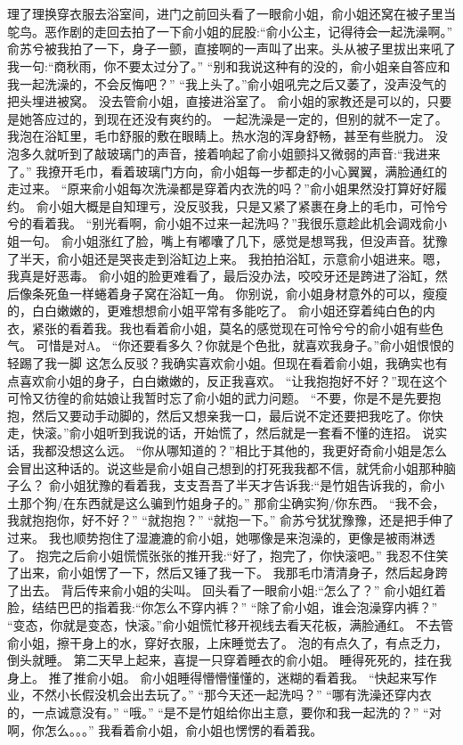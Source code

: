\chapter{}
理了理换穿衣服去浴室间，进门之前回头看了一眼俞小姐，俞小姐还窝在被子里当鸵鸟。恶作剧的走回去拍了一下俞小姐的屁股:“俞小公主，记得待会一起洗澡啊。”
俞苏兮被我拍了一下，身子一颤，直接啊的一声叫了出来。头从被子里拔出来吼了我一句:“商秋雨，你不要太过分了。”
“别和我说这种有的没的，俞小姐亲自答应和我一起洗澡的，不会反悔吧？”
“我上头了。”俞小姐吼完之后又萎了，没声没气的把头埋进被窝。
没去管俞小姐，直接进浴室了。
俞小姐的家教还是可以的，只要是她答应过的，到现在还没有爽约的。
一起洗澡是一定的，但别的就不一定了。
我泡在浴缸里，毛巾舒服的敷在眼睛上。热水泡的浑身舒畅，甚至有些脱力。
没泡多久就听到了敲玻璃门的声音，接着响起了俞小姐颤抖又微弱的声音:“我进来了。”
我撩开毛巾，看着玻璃门方向，俞小姐每一步都走的小心翼翼，满脸通红的走过来。
“原来俞小姐每次洗澡都是穿着内衣洗的吗？”俞小姐果然没打算好好履约。
俞小姐大概是自知理亏，没反驳我，只是又紧了紧裹在身上的毛巾，可怜兮兮的看着我。
“别光看啊，俞小姐不过来一起洗吗？”我很乐意趁此机会调戏俞小姐一句。
俞小姐涨红了脸，嘴上有嘟囔了几下，感觉是想骂我，但没声音。犹豫了半天，俞小姐还是哭丧走到浴缸边上来。
我拍拍浴缸，示意俞小姐进来。嗯，我真是好恶毒。
俞小姐的脸更难看了，最后没办法，咬咬牙还是跨进了浴缸，然后像条死鱼一样蜷着身子窝在浴缸一角。
你别说，俞小姐身材意外的可以，瘦瘦的，白白嫩嫩的，更难想想俞小姐平常有多能吃了。
俞小姐还穿着纯白色的内衣，紧张的看着我。我也看着俞小姐，莫名的感觉现在可怜兮兮的俞小姐有些色气。
可惜是对A。
“你还要看多久？你就是个色批，就喜欢我身子。”俞小姐恨恨的轻踢了我一脚
这怎么反驳？我确实喜欢俞小姐。但现在看着俞小姐，我确实也有点喜欢俞小姐的身子，白白嫩嫩的，反正我喜欢。
“让我抱抱好不好？”现在这个可怜又彷徨的俞姑娘让我暂时忘了俞小姐的武力问题。
“不要，你是不是先要抱抱，然后又要动手动脚的，然后又想亲我一口，最后说不定还要把我吃了。你快走，快滚。”俞小姐听到我说的话，开始慌了，然后就是一套看不懂的连招。
说实话，我都没想这么远。
“你从哪知道的？”相比于其他的，我更好奇俞小姐是怎么会冒出这种话的。说这些是俞小姐自己想到的打死我我都不信，就凭俞小姐那种脑子么？
俞小姐犹豫的看着我，支支吾吾了半天才告诉我:“是竹姐告诉我的，俞小土那个狗/在东西就是这么骗到竹姐身子的。”
那俞尘确实狗/你东西。
“我不会，我就抱抱你，好不好？”
“就抱抱？”
“就抱一下。”
俞苏兮犹犹豫豫，还是把手伸了过来。
我也顺势抱住了湿漉漉的俞小姐，她哪像是来泡澡的，更像是被雨淋透了。
抱完之后俞小姐慌慌张张的推开我:“好了，抱完了，你快滚吧。”
我忍不住笑了出来，俞小姐愣了一下，然后又锤了我一下。
我那毛巾清清身子，然后起身跨了出去。
背后传来俞小姐的尖叫。
回头看了一眼俞小姐:“怎么了？”
俞小姐红着脸，结结巴巴的指着我:“你怎么不穿内裤？”
“除了俞小姐，谁会泡澡穿内裤？”
“变态，你就是变态，快滚。”俞小姐慌忙移开视线去看天花板，满脸通红。
不去管俞小姐，擦干身上的水，穿好衣服，上床睡觉去了。
泡的有点久了，有点乏力，倒头就睡。
第二天早上起来，喜提一只穿着睡衣的俞小姐。
睡得死死的，挂在我身上。
推了推俞小姐。
俞小姐睡得懵懵懂懂的，迷糊的看着我。
“快起来写作业，不然小长假没机会出去玩了。”
“那今天还一起洗吗？”
“哪有洗澡还穿内衣的，一点诚意没有。”
“哦。”
“是不是竹姐给你出主意，要你和我一起洗的？”
“对啊，你怎么。。。”
我看着俞小姐，俞小姐也愣愣的看着我。

